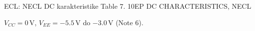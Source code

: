 \begin{frame}[label=10-s095]{ECL: NECL DC karakteristike}
\setlength{\abovedisplayskip}{4pt}\setlength{\belowdisplayskip}{4pt}\setlength{\abovedisplayshortskip}{3pt}\setlength{\belowdisplayshortskip}{3pt}
Table 7. 10EP DC CHARACTERISTICS, NECL\par
$V_{CC}=0\,\mathrm V$, $V_{EE}=-5.5\,\mathrm V$ do $-3.0\,\mathrm V$ (Note 6).\par\smallskip

\end{frame}
